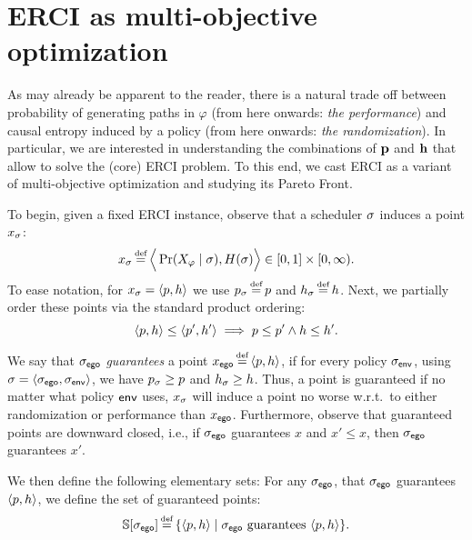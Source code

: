 \section{ERCI as multi-objective optimization}\label{sec:convex}
As may already be apparent to the reader, there is a natural trade off
between probability of generating paths in $\varphi$ (from here
onwards: \emph{the performance}) and causal entropy induced by a
policy (from here onwards: \emph{the randomization}).  In particular,
we are interested in understanding the combinations of $\mathbf{p}$
and $\mathbf{h}$ that allow to solve the (core) ERCI problem. To this
end, we cast ERCI as a variant of multi-objective optimization and
studying its Pareto Front.

To begin, given a fixed ERCI instance, observe that a scheduler $\sigma$
induces a point $x_\sigma$:
\begin{equation}
  x_\sched \eqdef \Big\langle \Pr(X_\varphi \mid \sched), H(\sched) \Big\rangle \in [0,1] \times [0,\infty).  
\end{equation}
To ease notation, for $x_\sigma = \langle p,h \rangle$ we use
$\scp_\sched \eqdef \scp$ and $\rndp_\sched \eqdef \rndp$. Next, we
partially order these points via the standard product ordering:
\begin{equation}
  \langle p,h \rangle \leq \langle p',h' \rangle \implies p \leq p' \wedge h \leq h'.
\end{equation}

We say that ${\sigma_{\mathsf{ego}}}$ \emph{guarantees} a point $x_\pOne \eqdef
\langle \scp, \rndp \rangle$, if for every policy ${\sigma_{\mathsf{env}}}$, using
$\sigma = \langle {\sigma_{\mathsf{ego}}}, {\sigma_{\mathsf{env}}} \rangle$, we have
$p_\sigma \geq p$ and $h_\sigma \geq h$. Thus, a point
is guaranteed if no matter what policy $\mathsf{env}$ uses, $x_\sigma$ will
induce a point no worse w.r.t.\ to either randomization or performance
than $x_{\mathsf{ego}}$. Furthermore, observe that guaranteed points are
downward closed, i.e., if ${\sigma_{\mathsf{ego}}}$ guarantees $x$ and $x' \leq x$,
then ${\sigma_{\mathsf{ego}}}$ guarantees $x'$.

\begin{example}
	
\end{example}

We then define the following elementary sets: For any ${\sigma_{\mathsf{ego}}}$,
that ${\sigma_{\mathsf{ego}}}$ guarantees $\langle p, h \rangle$, we define
the set of guaranteed points:
\begin{equation}\label{eq:guaranteed}
  \solutions[\pOneSched] \eqdef \{ \langle \scp, \rndp \rangle \mid  \pOneSched \text{ guarantees } \langle \scp, \rndp \rangle \}.
\end{equation}

